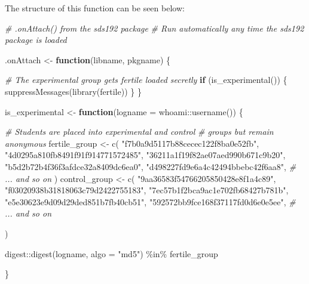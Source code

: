 \documentclass[12pt,twoside]{reedthesis}
\newenvironment{Shaded}{\begin{snugshade}}{\end{snugshade}}
\newcommand{\AttributeTok}[1]{\textcolor[rgb]{0.77,0.63,0.00}{#1}}
\newcommand{\CommentTok}[1]{\textcolor[rgb]{0.56,0.35,0.01}{\textit{#1}}}
\newcommand{\ControlFlowTok}[1]{\textcolor[rgb]{0.13,0.29,0.53}{\textbf{#1}}}
\newcommand{\FunctionTok}[1]{\textcolor[rgb]{0.00,0.00,0.00}{#1}}
\newcommand{\NormalTok}[1]{#1}
\newcommand{\OtherTok}[1]{\textcolor[rgb]{0.56,0.35,0.01}{#1}}
\newcommand{\SpecialCharTok}[1]{\textcolor[rgb]{0.00,0.00,0.00}{#1}}
\newcommand{\StringTok}[1]{\textcolor[rgb]{0.31,0.60,0.02}{#1}}
\begin{document}
The structure of this function can be seen below:
\begin{Shaded}
\begin{Highlighting}[]
\CommentTok{\# .onAttach() from the sds192 package}
\CommentTok{\# Run automatically any time the sds192 package is loaded}

\NormalTok{.onAttach }\OtherTok{\textless{}{-}} \ControlFlowTok{function}\NormalTok{(libname, pkgname) \{}

  \CommentTok{\# The experimental group gets \textasciigrave{}fertile\textasciigrave{} loaded secretly}
  \ControlFlowTok{if}\NormalTok{ (}\FunctionTok{is\_experimental}\NormalTok{()) \{}
    \FunctionTok{suppressMessages}\NormalTok{(}\FunctionTok{library}\NormalTok{(fertile))}
\NormalTok{  \}}
\NormalTok{\}}

\NormalTok{is\_experimental }\OtherTok{\textless{}{-}} \ControlFlowTok{function}\NormalTok{(}\AttributeTok{logname =}\NormalTok{ whoami}\SpecialCharTok{::}\FunctionTok{username}\NormalTok{()) \{}
  
  \CommentTok{\# Students are placed into experimental and control}
  \CommentTok{\# groups but remain anonymous}
\NormalTok{  fertile\_group }\OtherTok{\textless{}{-}} \FunctionTok{c}\NormalTok{(}
    \StringTok{"f7b0a9d5117b88cecec122f8ba0e52fb"}\NormalTok{,}
    \StringTok{"4d0295a810fb8491f91f914771572485"}\NormalTok{,}
    \StringTok{"36211a1f19f82ae07aed990b671c9b20"}\NormalTok{,}
    \StringTok{"b5d2b72b4f36f3afdce32a8409dc6ea0"}\NormalTok{,}
    \StringTok{"d498227fd9e6a4c42494bbebc42f6aa8"}\NormalTok{,}
    \CommentTok{\# ... and so on}
\NormalTok{  )}
\NormalTok{  control\_group }\OtherTok{\textless{}{-}} \FunctionTok{c}\NormalTok{(}
    \StringTok{"9aa36583f54766205850428e8f1a4c89"}\NormalTok{, }
    \StringTok{"f03020938b31818063c79d2422755183"}\NormalTok{, }
    \StringTok{"7ec57b1f2bca9ac1e702fb68427b781b"}\NormalTok{, }
    \StringTok{"e5e30623e9d09d29ded851b7fb40cb51"}\NormalTok{, }
    \StringTok{"592572bb9fce168f37117fd0d6e0e5ee"}\NormalTok{,}
    \CommentTok{\# ... and so on}
 
\NormalTok{  )}
  

\NormalTok{  digest}\SpecialCharTok{::}\FunctionTok{digest}\NormalTok{(logname, }\AttributeTok{algo =} \StringTok{"md5"}\NormalTok{) }\SpecialCharTok{\%in\%}\NormalTok{ fertile\_group}
  
\NormalTok{\}}
\end{Highlighting}
\end{Shaded}
\end{document}
